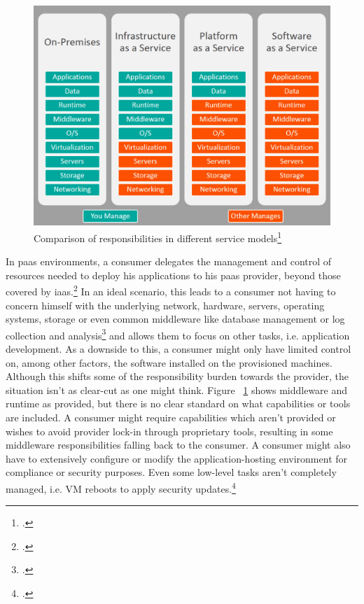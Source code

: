 \begin{figure}[H]
\includegraphics[scale=0.4]{pictures/ServiceComparison.jpg} 
\caption{Comparison of responsibilities in different service models\protect\footcite[][, section 'Original reference image']{servicecomparison}}
\label{fig:servicecomparison}
\end{figure}

In \gls{paas} environments, a consumer delegates the management and control of resources needed to deploy his applications to his \gls{paas} provider, beyond those covered by \gls{iaas}.\footcite[][p. 2 to 3]{nistcloud}
In an ideal scenario, this leads to a consumer not having to concern himself with the underlying network, hardware, servers, operating systems, storage or even common middleware like database management or log collection and analysis\footcite[][, section 'Advantages of PaaS']{msPaas} and allows them to focus on other tasks, i.e. application development.
As a downside to this, a consumer might only have limited control on, among other factors, the software installed on the provisioned machines. 
Although this shifts some of the responsibility burden towards the provider, the situation isn't as clear-cut as one might think. 
Figure ~\ref{fig:servicecomparison} shows middleware and runtime as provided, but there is no clear standard on what capabilities or tools are included.
A consumer might require capabilities which aren't provided or wishes to avoid provider lock-in through proprietary tools, 
resulting in some middleware responsibilities falling back to the consumer. 
A consumer might also have to extensively configure or modify the application-hosting environment for compliance or security purposes. 
Even some low-level tasks aren't completely managed, i.e. VM reboots to apply security updates.\footcite[][, section 'Process Linux node updates and reboots using kured']{msVmReboot}

